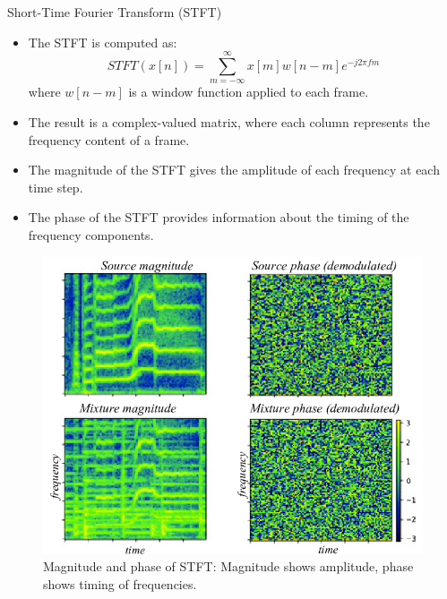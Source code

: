 \begin{frame}[allowframebreaks]{Short-Time Fourier Transform (STFT)}
    \begin{itemize}
        \item The STFT is computed as:
        \[
            STFT(x[n]) = \sum_{m=-\infty}^{\infty} x[m] w[n-m] e^{-j2\pi f m}
        \]
        where $w[n-m]$ is a window function applied to each frame.
    \end{itemize}
\framebreak
    \begin{itemize}
        \item The result is a complex-valued matrix, where each column represents the frequency content of a frame.
        \item The magnitude of the STFT gives the amplitude of each frequency at each time step.
        \item The phase of the STFT provides information about the timing of the frequency components.
    \end{itemize}
    \begin{figure}
        \centering
        \includegraphics[width=\textwidth,height=0.75\textheight,keepaspectratio]{images/audio-nlp/stft-magnitude-phase.png}
        \caption*{Magnitude and phase of STFT: Magnitude shows amplitude, phase shows timing of frequencies.}
    \end{figure}
\end{frame}

